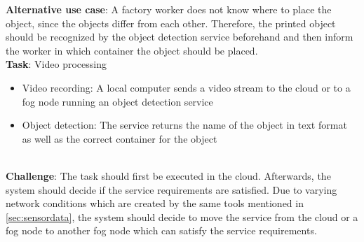 \textbf{Alternative use case}: A factory worker does not know where to place the object, since the objects differ from each other. Therefore, the printed object should be recognized by the object detection service beforehand and then inform the worker in which container the object should be placed.\\

\textbf{Task}: Video processing
\begin{itemize}
    \item Video recording: A local computer sends a video stream to the cloud or to a fog node running an object detection service
    \item Object detection: The service returns the name of the object in text format as well as the correct container for the object
\end{itemize}
\\
\textbf{Challenge}: The task should first be executed in the cloud. Afterwards, the system should decide if the service requirements are satisfied. Due to varying network conditions which are created by the same tools mentioned in \ref{sec:sensordata}, the system should decide to move the service from the cloud or a fog node to another fog node which can satisfy the service requirements.